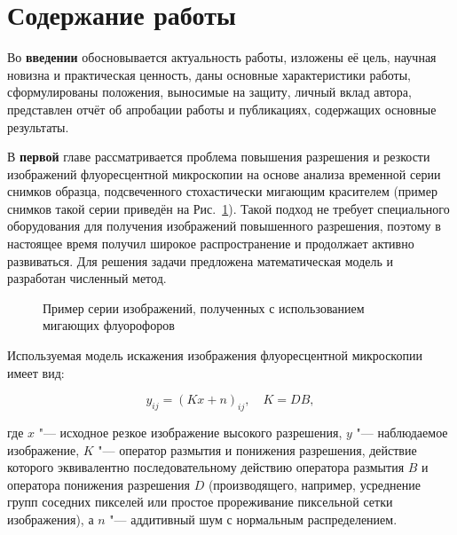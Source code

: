 \section*{Содержание работы}

Во {\textbf{введении}} обосновывается актуальность работы, изложены её цель, научная новизна и практическая ценность, даны основные характеристики работы, сформулированы положения, выносимые на защиту, личный вклад автора, представлен отчёт об апробации работы и публикациях, содержащих основные результаты.


В {\textbf{первой}} главе рассматривается проблема повышения разрешения и резкости изображений флуоресцентной микроскопии на основе анализа временной серии снимков образца, подсвеченного стохастически мигающим красителем (пример снимков такой серии приведён на Рис.~\ref{fig:sinopsis-blinking-samples}). Такой подход не требует специального оборудования для получения изображений повышенного разрешения, поэтому в настоящее время получил широкое распространение и продолжает активно развиваться. Для решения задачи предложена математическая модель и разработан численный метод.

\begin{figure}[ht]
	\caption{Пример серии изображений, полученных с использованием мигающих флуорофоров}
	\label{fig:sinopsis-blinking-samples}
\end{figure}

Используемая модель искажения изображения флуоресцентной микроскопии имеет вид:

\begin{equation*}
	y_{ij} = \left(Kx+n\right)_{ij},\quad K=DB,
\end{equation*}

\noindent где $x$ "--- исходное резкое изображение высокого разрешения, $y$ "--- наблюдаемое изображение, $K$ "--- оператор размытия и понижения разрешения, действие которого эквивалентно последовательному действию оператора размытия $B$ и оператора понижения разрешения $D$ (производящего, например, усреднение групп соседних пикселей или простое прореживание пиксельной сетки изображения), а $n$ "--- аддитивный шум с нормальным распределением.


